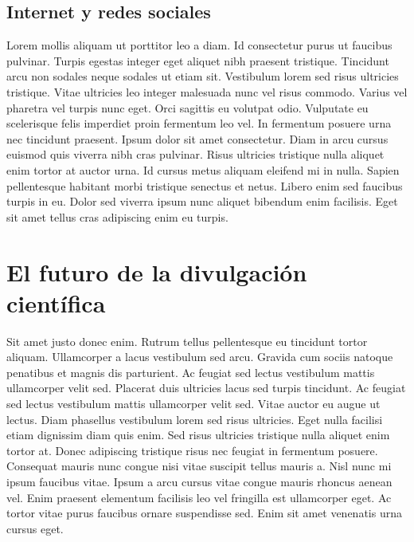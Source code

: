 \section{Internet y redes sociales}
Lorem mollis aliquam ut porttitor leo a diam. Id consectetur purus ut faucibus pulvinar. Turpis egestas integer eget aliquet nibh praesent tristique. Tincidunt arcu non sodales neque sodales ut etiam sit. Vestibulum lorem sed risus ultricies tristique. Vitae ultricies leo integer malesuada nunc vel risus commodo. Varius vel pharetra vel turpis nunc eget. Orci sagittis eu volutpat odio. Vulputate eu scelerisque felis imperdiet proin fermentum leo vel. In fermentum posuere urna nec tincidunt praesent. Ipsum dolor sit amet consectetur. Diam in arcu cursus euismod quis viverra nibh cras pulvinar. Risus ultricies tristique nulla aliquet enim tortor at auctor urna. Id cursus metus aliquam eleifend mi in nulla. Sapien pellentesque habitant morbi tristique senectus et netus. Libero enim sed faucibus turpis in eu. Dolor sed viverra ipsum nunc aliquet bibendum enim facilisis. Eget sit amet tellus cras adipiscing enim eu turpis.

\chapter{El futuro de la divulgación científica}
Sit amet justo donec enim. Rutrum tellus pellentesque eu tincidunt tortor aliquam. Ullamcorper a lacus vestibulum sed arcu. Gravida cum sociis natoque penatibus et magnis dis parturient. Ac feugiat sed lectus vestibulum mattis ullamcorper velit sed. Placerat duis ultricies lacus sed turpis tincidunt. Ac feugiat sed lectus vestibulum mattis ullamcorper velit sed. Vitae auctor eu augue ut lectus. Diam phasellus vestibulum lorem sed risus ultricies. Eget nulla facilisi etiam dignissim diam quis enim. Sed risus ultricies tristique nulla aliquet enim tortor at. Donec adipiscing tristique risus nec feugiat in fermentum posuere. Consequat mauris nunc congue nisi vitae suscipit tellus mauris a. Nisl nunc mi ipsum faucibus vitae. Ipsum a arcu cursus vitae congue mauris rhoncus aenean vel. Enim praesent elementum facilisis leo vel fringilla est ullamcorper eget. Ac tortor vitae purus faucibus ornare suspendisse sed. Enim sit amet venenatis urna cursus eget.

